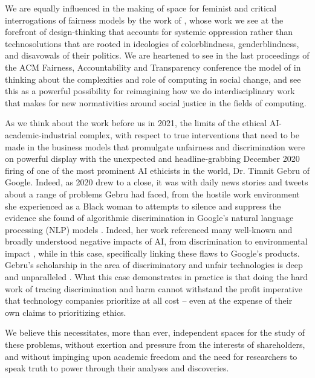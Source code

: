 \documentclass[11pt]{article}
\begin{document}
We are equally influenced in the making of space for feminist and critical interrogations of fairness models by the work of \cite{hoffmann2019fairness}, whose work we see at the forefront of design-thinking that accounts for systemic oppression rather than technosolutions that are rooted in ideologies of colorblindness, genderblindness, and disavowals of their politics. We are heartened to see in the last proceedings of the ACM Fairness, Accountability and Transparency conference the model of \cite{abebe2020roles} in thinking about the complexities and role of computing in social change, and see this as a powerful possibility for reimagining how we do interdisciplinary work that makes for new normativities around social justice in the fields of computing.


As we think about the work before us in 2021, the limits of the ethical AI-academic-industrial complex, with respect to true interventions that need to be made in the business models that promulgate unfairness and discrimination were on powerful display with the unexpected and headline-grabbing December 2020 firing of one of the most prominent AI ethicists in the world, Dr. Timnit Gebru of Google. Indeed, as 2020 drew to a close, it was with daily news stories and tweets about a range of problems Gebru had faced, from the hostile work environment she experienced as a Black woman to attempts to silence and suppress the evidence she found of algorithmic discrimination in Google’s natural language processing (NLP) models \cite{Hao2020}. Indeed, her work referenced many well-known and broadly understood negative impacts of AI, from discrimination to environmental impact \cite{crawford2019ai1}, while in this case, specifically linking these flaws to Google’s products. Gebru’s scholarship in the area of discriminatory and unfair technologies is deep and unparalleled \cite{gebru2019oxford,gebru2018datasheets,buolamwini2018gender1}. What this case demonstrates in practice is that doing the hard work of tracing discrimination and harm cannot withstand the profit imperative that technology companies prioritize at all cost -- even at the expense of their own claims to prioritizing ethics. 

We believe this necessitates, more than ever, independent spaces for the study of these problems, without exertion and pressure from the interests of shareholders, and without impinging upon academic freedom and the need for researchers to speak truth to power through their analyses and discoveries. 
\end{document}
